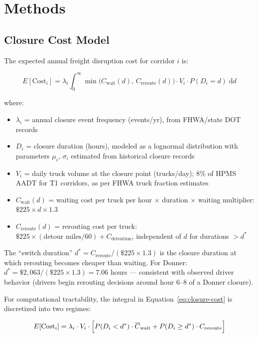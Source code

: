 \section{Methods}

\subsection{Closure Cost Model}

The expected annual freight disruption cost for corridor $i$ is:

\begin{equation}
\label{eq:closure-cost}
E[\text{Cost}_i] = \lambda_i \int_0^\infty \min\!\bigl(C_\text{wait}(d),\,
C_\text{reroute}(d)\bigr) \cdot V_i \cdot P(D_i = d)\; \mathrm{d}d
\end{equation}

where:
\begin{itemize}
\item $\lambda_i$ = annual closure event frequency (events/yr), from FHWA/state DOT records
\item $D_i$ = closure duration (hours), modeled as a lognormal distribution with
parameters $\mu_i$, $\sigma_i$ estimated from historical closure records
\item $V_i$ = daily truck volume at the closure point (trucks/day); 8\% of HPMS AADT
for T1 corridors, as per FHWA truck fraction estimates
\item $C_\text{wait}(d)$ = waiting cost per truck per hour $\times$ duration $\times$
waiting multiplier: $\$225 \times d \times 1.3$
\item $C_\text{reroute}(d)$ = rerouting cost per truck: $\$225 \times (\text{detour
miles}/60) + C_\text{detention}$, independent of $d$ for durations $> d^*$
\end{itemize}

The ``switch duration'' $d^* = C_\text{reroute} / (\$225 \times 1.3)$ is the closure
duration at which rerouting becomes cheaper than waiting. For Donner: $d^* = \$2,063
/ (\$225 \times 1.3) = 7.06$ hours --- consistent with observed driver behavior
(drivers begin rerouting decisions around hour 6--8 of a Donner closure).

For computational tractability, the integral in Equation~\ref{eq:closure-cost} is
discretized into two regimes:

\begin{equation}
E[\text{Cost}_i] = \lambda_i \cdot V_i \cdot \Bigl[
P(D_i < d^*) \cdot \overline{C}_\text{wait}
+ P(D_i \geq d^*) \cdot C_\text{reroute}
\Bigr]
\end{equation}

